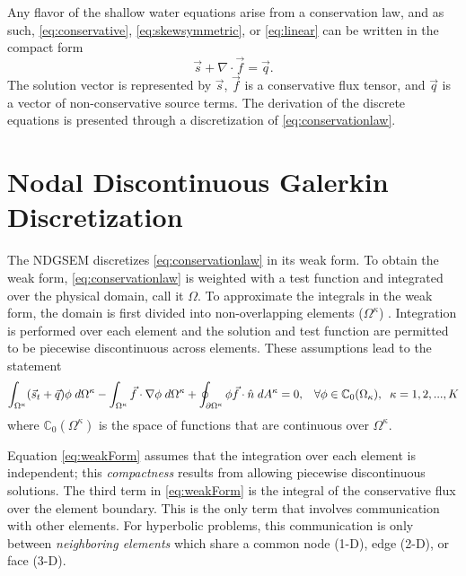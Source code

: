 \documentclass{softwaremanual}
\begin{document}
Any flavor of the shallow water equations arise from a conservation law, and as such, \eqref{eq:conservative}, \eqref{eq:skewsymmetric}, or \eqref{eq:linear} can be written in the compact form
\begin{equation}
\vec{s} + \nabla \cdot \vec{f} = \vec{q}. \label{eq:conservationlaw}
\end{equation}
The solution vector is represented by $\vec{s}$, $\vec{f}$ is a conservative flux tensor, and $\vec{q}$ is a vector of non-conservative source terms. The derivation of the discrete equations is presented through a discretization of \eqref{eq:conservationlaw}. 

\section{Nodal Discontinuous Galerkin Discretization}


The NDGSEM discretizes \eqref{eq:conservationlaw} in its weak form. To obtain the weak form, \eqref{eq:conservationlaw} is weighted with a test function and integrated over the physical domain, call it $\Omega$. To approximate the integrals in the weak form, the domain is first divided into non-overlapping elements  ($\Omega^\kappa$) . Integration is performed over each element and the solution and test function are permitted to be piecewise discontinuous across elements. These assumptions lead to the statement
  \begin{equation}
  \int_{\Omega^\kappa} (\vec{s}_t + \vec{q} )\phi \hspace{1mm} d\Omega^\kappa  - \int_{\Omega^\kappa} \vec{f} \cdot \nabla \phi \hspace{1mm} d\Omega^\kappa + \oint_{\partial \Omega^\kappa} \phi \vec{f}\cdot \hat{n} \hspace{1mm} d A^\kappa = 0, \hspace{3mm} \forall \phi \in \mathbb{C}_0(\Omega_\kappa), \hspace{2mm} \kappa=1,2,...,K \label{eq:weakForm}
  \end{equation}
where $\mathbb{C}_0(\Omega^\kappa)$ is the space of functions that are continuous over $\Omega^\kappa$.

Equation \eqref{eq:weakForm} assumes that the integration over each element is independent; this \textit{compactness} results from allowing piecewise discontinuous solutions. The third term in \eqref{eq:weakForm} is the integral of the conservative flux over the element boundary. This is the only term that involves communication with other elements. For hyperbolic problems, this communication is only between \textit{neighboring elements} which share a common node (1-D), edge (2-D), or face (3-D).
\end{document}
